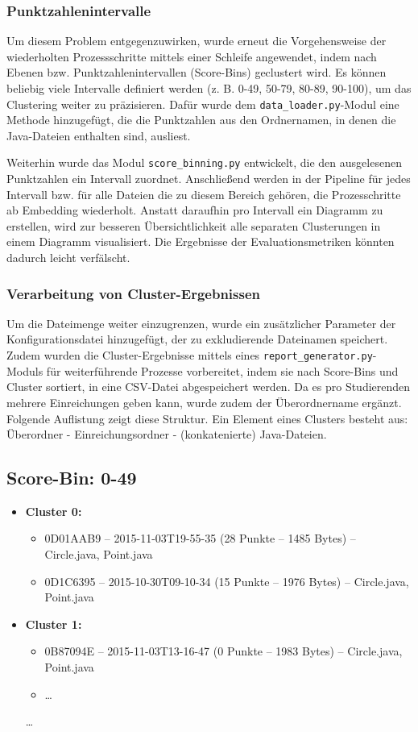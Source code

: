 \subsubsection*{Punktzahlenintervalle}
Um diesem Problem entgegenzuwirken, wurde erneut die Vorgehensweise der wiederholten Prozessschritte mittels einer Schleife angewendet, indem nach Ebenen bzw. Punktzahlenintervallen (Score-Bins) geclustert wird. Es können beliebig viele Intervalle definiert werden (z. B. 0-49, 50-79, 80-89, 90-100), um das Clustering weiter zu präzisieren. Dafür wurde dem \texttt{data\_loader.py}-Modul eine Methode hinzugefügt, die die Punktzahlen aus den Ordnernamen, in denen die Java-Dateien enthalten sind, ausliest.

Weiterhin wurde das Modul \texttt{score\_binning.py} entwickelt, die den ausgelesenen Punktzahlen ein Intervall zuordnet. Anschließend werden in der Pipeline für jedes Intervall bzw. für alle Dateien die zu diesem Bereich gehören, die Prozesschritte ab Embedding wiederholt. Anstatt daraufhin pro Intervall ein Diagramm zu erstellen, wird zur besseren Übersichtlichkeit alle separaten Clusterungen in einem Diagramm visualisiert. Die Ergebnisse der Evaluationsmetriken könnten dadurch leicht verfälscht.


\subsubsection*{Verarbeitung von Cluster-Ergebnissen}
Um die Dateimenge weiter einzugrenzen, wurde ein zusätzlicher Parameter der Konfigurationsdatei hinzugefügt, der zu exkludierende Dateinamen speichert. Zudem wurden die Cluster-Ergebnisse mittels eines \texttt{report\_generator.py}-Moduls für weiterführende Prozesse vorbereitet, indem sie nach Score-Bins und Cluster sortiert, in eine CSV-Datei abgespeichert werden. Da es pro Studierenden mehrere Einreichungen geben kann, wurde zudem der Überordnername ergänzt. Folgende Auflistung zeigt diese Struktur. Ein Element eines Clusters besteht aus: Überordner - Einreichungsordner - (konkatenierte) Java-Dateien.

\subsection*{Score-Bin: 0-49}
\begin{itemize}
  \item \textbf{Cluster 0:}
  \begin{itemize}
    \item 0D01AAB9 -- 2015-11-03T19-55-35 (28 Punkte -- 1485 Bytes) -- Circle.java, Point.java
    \item 0D1C6395 -- 2015-10-30T09-10-34 (15 Punkte -- 1976 Bytes) -- Circle.java, Point.java
  \end{itemize}
  \item \textbf{Cluster 1:}
  \begin{itemize}
    \item 0B87094E -- 2015-11-03T13-16-47 (0 Punkte -- 1983 Bytes) -- Circle.java, Point.java
    \item \dots
  \end{itemize}
  \dots
\end{itemize}


